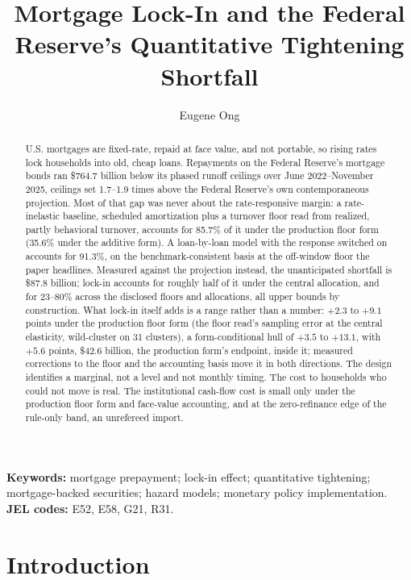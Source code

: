\documentclass[12pt]{article}
\title{Mortgage Lock-In and the Federal Reserve's Quantitative Tightening Shortfall}
\author{Eugene Ong}
\affil{Carnegie Mellon University}
\date{}
\begin{document}
\maketitle
\begin{abstract}
\noindent U.S. mortgages are fixed-rate, repaid at face value, and not portable, so rising rates lock households into old, cheap loans. Repayments on the Federal Reserve's mortgage bonds ran \$764.7 billion below its phased runoff ceilings over June 2022--November 2025, ceilings set 1.7--1.9 times above the Federal Reserve's own contemporaneous projection. Most of that gap was never about the rate-responsive margin: a rate-inelastic baseline, scheduled amortization plus a turnover floor read from realized, partly behavioral turnover, accounts for 85.7\% of it under the production floor form (35.6\% under the additive form). A loan-by-loan model with the response switched on accounts for 91.3\%, on the benchmark-consistent basis at the off-window floor the paper headlines. Measured against the projection instead, the unanticipated shortfall is \$87.8 billion; lock-in accounts for roughly half of it under the central allocation, and for 23--80\% across the disclosed floors and allocations, all upper bounds by construction. What lock-in itself adds is a range rather than a number: $+2.3$ to $+9.1$ points under the production floor form (the floor read's sampling error at the central elasticity, wild-cluster on 31 clusters), a form-conditional hull of $+3.5$ to $+13.1$, with $+5.6$ points, \$42.6 billion, the production form's endpoint, inside it; measured corrections to the floor and the accounting basis move it in both directions. The design identifies a marginal, not a level and not monthly timing. The cost to households who could not move is real. The institutional cash-flow cost is small only under the production floor form and face-value accounting, and at the zero-refinance edge of the rule-only band, an unrefereed import.
\end{abstract}

\vspace{0.5\baselineskip}
{\footnotesize\noindent\textbf{Keywords:} mortgage prepayment; lock-in effect; quantitative tightening; mortgage-backed securities; hazard models; monetary policy implementation.\\
\textbf{JEL codes:} E52, E58, G21, R31.\par}
\newpage
\section{Introduction}\label{sec:intro}
\end{document}
